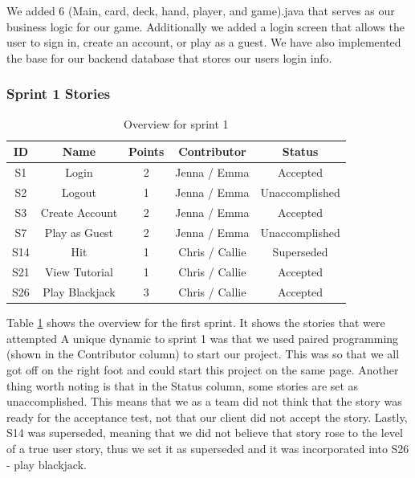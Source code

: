 \noindent We added 6 (Main, card, deck, hand, player, and game).java that serves as our business logic for our game. Additionally we added a login screen that allows the user to sign in, create an account, or play as a guest. We have also implemented the base for our backend database that stores our users login info.

\subsubsection{Sprint 1 Stories}

\begin{table}[!hbt]
\centering
\caption{Overview for sprint 1}
\label{tab: sprint 1 overview}
\begin{tabular}{|c|c|c|c|c|}
\hline
\textbf{ID} & \textbf{Name}  & \textbf{Points} & \textbf{Contributor} & \textbf{Status}                       \\ \hline
S1          & Login          & 2               & Jenna / Emma         & {\color[HTML]{32CB00} Accepted}       \\ \hline
S2          & Logout         & 1               & Jenna / Emma         & {\color[HTML]{CB0000} Unaccomplished} \\ \hline
S3          & Create Account & 2               & Jenna / Emma         & {\color[HTML]{32CB00} Accepted}       \\ \hline
S7          & Play as Guest  & 2               & Jenna / Emma         & {\color[HTML]{CB0000} Unaccomplished} \\ \hline
S14         & Hit            & 1               & Chris / Callie       & {\color[HTML]{FFCB2F} Superseded}     \\ \hline
S21         & View Tutorial  & 1               & Chris / Callie       & {\color[HTML]{32CB00} Accepted}       \\ \hline
S26         & Play Blackjack & 3               & Chris / Callie       & {\color[HTML]{32CB00} Accepted}       \\ \hline
\end{tabular}
\end{table}

\noindent Table \ref{tab: sprint 1 overview} shows the overview for the first sprint. It shows the stories that were attempted A unique dynamic to sprint 1 was that we used paired programming (shown in the Contributor column) to start our project. This was so that we all got off on the right foot and could start this project on the same page. Another thing worth noting is that in the Status column, some stories are set as unaccomplished. This means that we as a team did not think that the story was ready for the acceptance test, not that our client did not accept the story. Lastly, S14 was superseded, meaning that we did not believe that story rose to the level of a true user story, thus we set it as superseded and it was incorporated into S26 - play blackjack.

